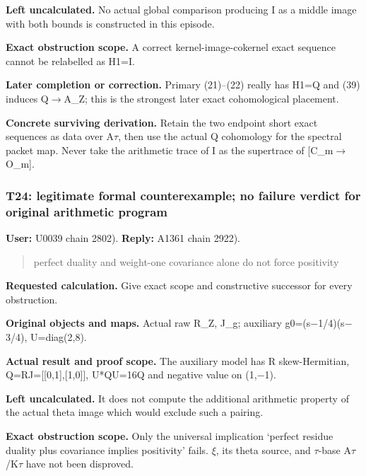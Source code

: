 \documentclass[10pt,a4paper,oneside]{report}
\begin{document}
\textbf{Left uncalculated.} No actual global comparison producing I as a
middle image with both bounds is constructed in this episode.

\textbf{Exact obstruction scope.} A correct kernel-image-cokernel exact
sequence cannot be relabelled as H1=I.

\textbf{Later completion or correction.} Primary (21)--(22) really has
H1=Q and (39) induces Q\allowbreak{}\ensuremath{→}\allowbreak{}A\_Z;
this is the strongest later exact cohomological placement.

\textbf{Concrete surviving derivation.} Retain the two endpoint short
exact sequences as data over A\allowbreak{}\ensuremath{τ}\allowbreak{},
then use the actual Q cohomology for the spectral packet map. Never take
the arithmetic trace of I as the supertrace of
[C\_m\allowbreak{}\ensuremath{→}\allowbreak{}O\_m].

\subsubsection{T24: legitimate formal counterexample; no failure verdict
for original arithmetic
program}\label{t24-legitimate-formal-counterexample-no-failure-verdict-for-original-arithmetic-program}

\textbf{User:} U0039
\protect{} chain 2802).
\textbf{Reply:} A1361
\protect{} chain 2922).

\begin{quote}
perfect duality and weight-one covariance alone do not force positivity
\end{quote}

\textbf{Requested calculation.} Give exact scope and constructive
successor for every obstruction.

\textbf{Original objects and maps.} Actual raw R\_Z, J\_g; auxiliary
g0=(s\allowbreak{}\ensuremath{−}\allowbreak{}1/4)(s\allowbreak{}\ensuremath{−}\allowbreak{}3/4),
U=diag(2,8).

\textbf{Actual result and proof scope.} The auxiliary model has R
skew-Hermitian, Q=RJ={[}{[}0,1{]},{[}1,0{]}{]}, U*QU=16Q and negative
value on (1,\allowbreak{}\ensuremath{−}\allowbreak{}1).

\textbf{Left uncalculated.} It does not compute the additional
arithmetic property of the actual theta image which would exclude such a
pairing.

\textbf{Exact obstruction scope.} Only the universal implication
`perfect residue duality plus covariance implies positivity' fails.
\allowbreak{}\ensuremath{ξ}\allowbreak{}, its theta source, and
\allowbreak{}\ensuremath{τ}\allowbreak{}-base
A\allowbreak{}\ensuremath{τ}\allowbreak{}/K\allowbreak{}\ensuremath{τ}\allowbreak{}
have not been disproved.
\end{document}
